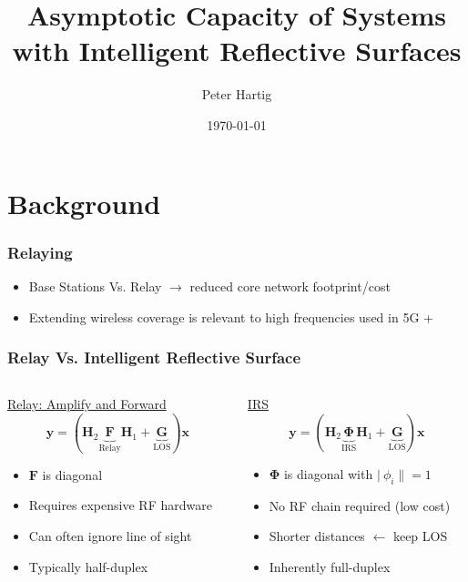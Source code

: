 \documentclass[10pt,tgadventor, onlymath]{beamer}
\title{\large \bfseries Asymptotic Capacity of Systems with Intelligent Reflective Surfaces}
\author{Peter Hartig\\[3ex]}
\date{\today}
\begin{document}
\frame{
\thispagestyle{empty}
\titlepage
}

\section{Background}

\begin{frame}
\frametitle{Relaying}

	\begin{itemize}
		\item 			
			Base Stations Vs. Relay $\rightarrow$ reduced core network footprint/cost
		\item 
			Extending wireless coverage is relevant to high frequencies used in 5G +
	\end{itemize}

\end{frame}

\begin{frame}
\frametitle{Relay Vs. Intelligent Reflective Surface}
\begin{columns}
\begin{column}{0.5\linewidth}
\centering 
	\underline{Relay: Amplify and Forward}
	\\
	\begin{equation*}
	\mathbf{y} = (\mathbf{H}_2\underbrace{\mathbf{F}}_{\text{Relay}}\mathbf{H}_1 + \underbrace{\mathbf{G}}_{\text{LOS}})\mathbf{x}
	\end{equation*}
	
	\begin{itemize}
	\item 
		$\mathbf{F}$ is diagonal
	\item 
		Requires expensive RF hardware
	\item 
		Can often ignore line of sight
	\item 
		Typically half-duplex
	\end{itemize}
\end{column}
\begin{column}{0.5\linewidth}
\centering 

	\underline{IRS}
	\\
	\begin{equation*}
	\mathbf{y} = (\mathbf{H}_2\underbrace{\boldsymbol{\Phi}}_{\text{IRS}}\mathbf{H}_1 + \underbrace{\mathbf{G}}_{\text{LOS}})\mathbf{x}
	\end{equation*} 
	\begin{itemize}
	\item 
		$\boldsymbol{\Phi}$ is diagonal with $|\ \phi_i \| =1$
	\item 
		No RF chain required (low cost)
	\item
		Shorter distances $\leftarrow$ keep LOS
	\item 
		Inherently full-duplex
	\end{itemize}
\end{column}
\end{columns}

\end{frame}
\end{document}
